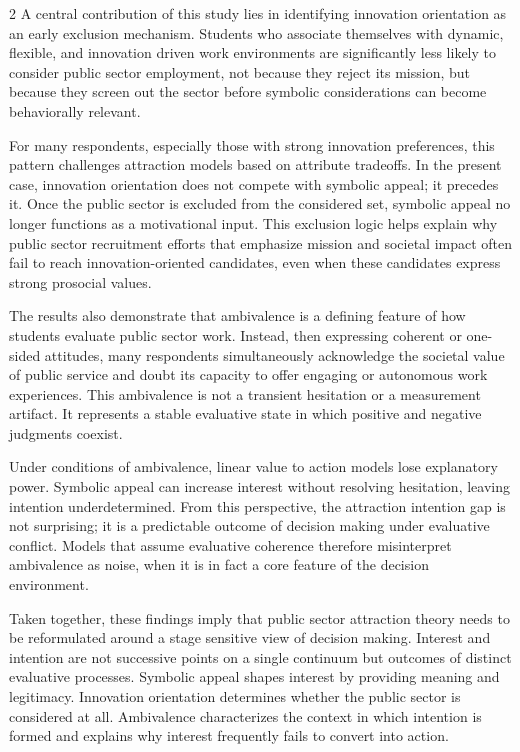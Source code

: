 \begin{multicols}{2}
A central contribution of this study lies in identifying innovation
orientation as an early exclusion mechanism. Students who associate
themselves with dynamic, flexible, and innovation driven work
environments are significantly less likely to consider public sector
employment, not because they reject its mission, but because they screen
out the sector before symbolic considerations can become behaviorally
relevant.

For many respondents, especially those with strong innovation
preferences, this pattern challenges attraction models based on
attribute tradeoffs. In the present case, innovation orientation does
not compete with symbolic appeal; it precedes it. Once the public sector
is excluded from the considered set, symbolic appeal no longer functions
as a motivational input. This exclusion logic helps explain why public
sector recruitment efforts that emphasize mission and societal impact
often fail to reach innovation-oriented candidates, even when these
candidates express strong prosocial values.

The results also demonstrate that ambivalence is a defining feature of
how students evaluate public sector work. Instead, then expressing
coherent or one-sided attitudes, many respondents simultaneously
acknowledge the societal value of public service and doubt its capacity
to offer engaging or autonomous work experiences. This ambivalence is
not a transient hesitation or a measurement artifact. It represents a
stable evaluative state in which positive and negative judgments
coexist.

Under conditions of ambivalence, linear value to action models lose
explanatory power. Symbolic appeal can increase interest without
resolving hesitation, leaving intention underdetermined. From this
perspective, the attraction intention gap is not surprising; it is a
predictable outcome of decision making under evaluative conflict. Models
that assume evaluative coherence therefore misinterpret ambivalence as
noise, when it is in fact a core feature of the decision environment.

Taken together, these findings imply that public sector attraction
theory needs to be reformulated around a stage sensitive view of
decision making. Interest and intention are not successive points on a
single continuum but outcomes of distinct evaluative processes. Symbolic
appeal shapes interest by providing meaning and legitimacy. Innovation
orientation determines whether the public sector is considered at all.
Ambivalence characterizes the context in which intention is formed and
explains why interest frequently fails to convert into action.


\end{multicols}
